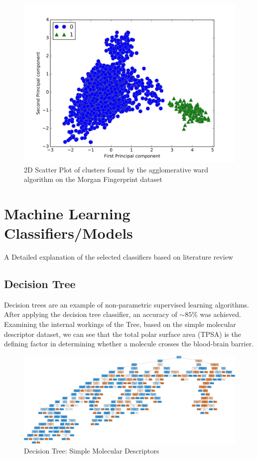 \documentclass[a4paper,12pt]{report}
\begin{document}
					\begin{figure}[H]
						\centering
						\includegraphics[width=\textwidth,scale=1,totalheight=0.4\textheight]{images/agg_morgan_scatter}
						\caption{2D Scatter Plot of clusters found by the agglomerative ward algorithm on the Morgan Fingerprint dataset}
						\label{fig:agg_morgan_scatter}
					\end{figure}
				
				
	
	\section{Machine Learning Classifiers/Models}
		A Detailed explanation of the selected classifiers based on literature review
		\subsection{Decision Tree}
		Decision trees are an example of non-parametric supervised learning algorithms.
		After applying the decision tree classifier, an accuracy of $\sim85\%$ was achieved. Examining the internal workings of the Tree, based on the simple molecular descriptor dataset, we can see that the total polar surface area (TPSA) is the defining factor in determining whether a molecule crosses the blood-brain barrier.
			\begin{figure}[H]
				\centering
				\includegraphics[width=\textwidth,scale=1,totalheight=0.4\textheight]{images/bbb_tree_smd}
				\caption{Decision Tree: Simple Molecular Descriptors}
				\label{fig:bbb_tree_smd}
			\end{figure}
\end{document}
